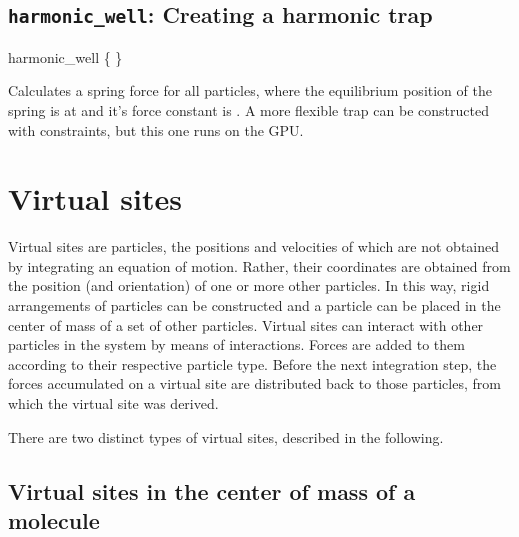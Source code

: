 \subsection{\texttt{harmonic_well}: Creating a harmonic trap}
 \begin{essyntax}
   harmonic_well \{    \} 
  \begin{features}
  \end{features}
 \end{essyntax}

 Calculates a spring force for all particles, where the equilibrium position
 of the spring is at  and it's force constant is . A more
 flexible trap can be constructed with constraints, but this one runs on the GPU.

\section{Virtual sites}
\label{sec:virtual}

Virtual sites are particles, the positions and velocities of which are
not obtained by integrating an equation of motion.  Rather, their
coordinates are obtained from the position (and orientation) of one or
more other particles. In this way, rigid arrangements of particles can
be constructed and a particle can be placed in the center of mass of a
set of other particles.  Virtual sites can interact with other
particles in the system by means of interactions. Forces are added to
them according to their respective particle type. Before the next
integration step, the forces accumulated on a virtual site are
distributed back to those particles, from which the virtual site was
derived.

There are two distinct types of virtual sites, described in the
following.

\subsection{Virtual sites in the center of mass of a molecule}

